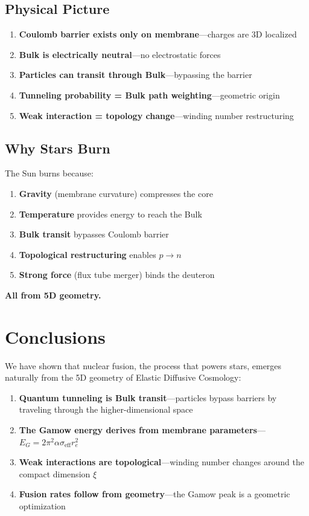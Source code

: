 \documentclass[12pt,a4paper]{article}
\begin{document}
\subsection{Physical Picture}

\begin{enumerate}
    \item \textbf{Coulomb barrier exists only on membrane}---charges are 3D localized
    \item \textbf{Bulk is electrically neutral}---no electrostatic forces
    \item \textbf{Particles can transit through Bulk}---bypassing the barrier
    \item \textbf{Tunneling probability = Bulk path weighting}---geometric origin
    \item \textbf{Weak interaction = topology change}---winding number restructuring
\end{enumerate}

\subsection{Why Stars Burn}

The Sun burns because:

\begin{enumerate}
    \item \textbf{Gravity} (membrane curvature) compresses the core
    \item \textbf{Temperature} provides energy to reach the Bulk
    \item \textbf{Bulk transit} bypasses Coulomb barrier
    \item \textbf{Topological restructuring} enables $p \to n$
    \item \textbf{Strong force} (flux tube merger) binds the deuteron
\end{enumerate}

\textbf{All from 5D geometry.}

\section{Conclusions}

We have shown that nuclear fusion, the process that powers stars, emerges naturally from the 5D geometry of Elastic Diffusive Cosmology:

\begin{enumerate}
    \item \textbf{Quantum tunneling is Bulk transit}---particles bypass barriers by traveling through the higher-dimensional space
    \item \textbf{The Gamow energy derives from membrane parameters}---$E_G = 2\pi^2\alpha\sigma_{\text{eff}}r_e^2$
    \item \textbf{Weak interactions are topological}---winding number changes around the compact dimension $\xi$
    \item \textbf{Fusion rates follow from geometry}---the Gamow peak is a geometric optimization
\end{enumerate}
\end{document}
